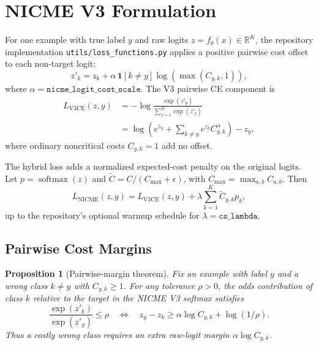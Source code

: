 \documentclass[11pt]{article}
\newcommand{\code}[1]{\texttt{#1}}
\newcommand{\pathref}[1]{\texttt{\small #1}}
\newcommand{\softmax}{\operatorname{softmax}}
\newcommand{\R}{\mathbb{R}}
\newcommand{\I}{\mathbf{1}}
\theoremstyle{definition}
\theoremstyle{plain}
\newtheorem{proposition}{Proposition}
\theoremstyle{remark}
\begin{document}
\section{NICME V3 Formulation}

For one example with true label $y$ and raw logits $z=f_\theta(x)\in\R^K$, the repository implementation
\pathref{utils/loss\_functions.py} applies a positive pairwise cost offset to each non-target logit:
\begin{equation}
  z'_k
  =
  z_k+\alpha\,\I[k\ne y]\log\left(\max(C_{y,k},1)\right),
  \label{eq:v3-adjusted-logits}
\end{equation}
where $\alpha=\code{nicme\_logit\_cost\_scale}$.
The V3 pairwise CE component is
\begin{align}
  L_{\mathrm{V3CE}}(z,y)
  &=
  -\log
  \frac{\exp(z'_y)}{\sum_{j=1}^K \exp(z'_j)}
  \nonumber\\
  &=
  \log\left(
    e^{z_y}
    +
    \sum_{k\ne y} e^{z_k} C_{y,k}^{\alpha}
  \right)-z_y,
  \label{eq:v3-ce}
\end{align}
where ordinary noncritical costs $C_{y,k}=1$ add no offset.

The hybrid loss adds a normalized expected-cost penalty on the original logits.
Let $p=\softmax(z)$ and $\tilde C=C/(C_{\max}+\epsilon)$, with
$C_{\max}=\max_{a,b}C_{a,b}$.
Then
\begin{equation}
  L_{\mathrm{NICME}}(z,y)
  =
  L_{\mathrm{V3CE}}(z,y)
  +
  \lambda
  \sum_{k=1}^{K}\tilde C_{y,k}p_k,
  \label{eq:nicme-loss}
\end{equation}
up to the repository's optional warmup schedule for $\lambda=\code{cs\_lambda}$.

\subsection{Pairwise Cost Margins}

\begin{proposition}[Pairwise-margin theorem]
Fix an example with label $y$ and a wrong class $k\ne y$ with $C_{y,k}\ge 1$.
For any tolerance $\rho>0$, the odds contribution of class $k$ relative to the target in the NICME V3 softmax satisfies
\begin{equation}
  \frac{\exp(z'_k)}{\exp(z'_y)}\le \rho
  \quad\Longleftrightarrow\quad
  z_y-z_k \ge \alpha\log C_{y,k}+\log(1/\rho).
  \label{eq:margin-equivalence}
\end{equation}
Thus a costly wrong class requires an extra raw-logit margin
$\alpha\log C_{y,k}$.
\end{proposition}
\end{document}
